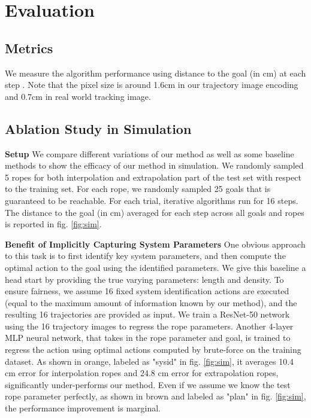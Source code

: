 \section{Evaluation}


\subsection{Metrics}
We measure the algorithm performance using distance to the goal (in cm) at each step .  Note that the pixel size is around 1.6cm in our trajectory image encoding and 0.7cm in  real world tracking image.



\subsection{Ablation Study in Simulation}

\textbf{Setup} We compare different variations of our method as well as some baseline methods to show the efficacy of our method in simulation. We randomly sampled 5 ropes for both interpolation and extrapolation part of the test set with respect to the training set. For each rope, we randomly sampled 25 goals that is guaranteed to be reachable. For each trial, iterative algorithms run for 16 steps. The distance to the goal (in cm) averaged for each step across all goals and ropes is reported in fig. \ref{fig:sim}.

\textbf{Benefit of Implicitly Capturing System Parameters}
One obvious approach to this task is to first identify key system parameters, and then compute the optimal action to the goal using the identified parameters. We give this baseline a head start by providing the true varying parameters: length and density. To ensure fairness, we assume 16 fixed system identification actions are executed (equal to the maximum amount of information known by our method), and the resulting 16 trajectories are provided as input. We train a ResNet-50 network using the 16 trajectory images to regress the rope parameters. Another 4-layer MLP neural network, that takes in the rope parameter and goal, is trained to regress the action using optimal actions computed by brute-force on the training dataset. As shown in orange, labeled as "sysid" in fig. \ref{fig:sim}, it averages 10.4 cm error for interpolation ropes and 24.8 cm error for extrapolation ropes, significantly under-performs our method. Even if we assume we know the test rope parameter perfectly, as shown in brown and labeled as "plan" in fig. \ref{fig:sim}, the performance improvement is marginal. 

